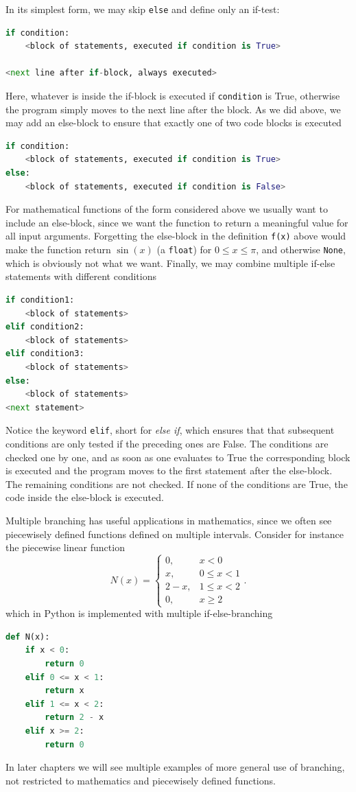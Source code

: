 \documentclass[graybox,envcountchap,sectrefs,final]{svmonodo}
\begin{document}
In its simplest form, we may skip \texttt{else} and define only an if-test:
\begin{lstlisting}[language=Python,style=blue1]
if condition:
    <block of statements, executed if condition is True>

<next line after if-block, always executed>
\end{lstlisting}
Here, whatever is inside the if-block is executed if \texttt{condition} is True, otherwise the program simply moves to the next line
after the block. As we did above, we may add an else-block to ensure that exactly one of two code blocks is executed
\begin{lstlisting}[language=Python,style=blue1]
if condition:
    <block of statements, executed if condition is True>
else:
    <block of statements, executed if condition is False>
\end{lstlisting}
For mathematical functions of the form considered above we usually want to include an else-block, since we want the function
to return a meaningful value for all input arguments. Forgetting the else-block in the definition \texttt{f(x)} above would
make the function return $\sin(x)$ (a \texttt{float}) for $0\leq x \leq \pi$, and otherwise \texttt{None}, which is obviously not what we want.
Finally, we may combine multiple if-else statements with different conditions
\begin{lstlisting}[language=Python,style=blue1]
if condition1:
    <block of statements>
elif condition2:
    <block of statements>
elif condition3:
    <block of statements>
else:
    <block of statements>
<next statement>
\end{lstlisting}
Notice the keyword \texttt{elif}, short for \emph{else if}, which ensures that that subsequent conditions are only tested if the preceding
ones are False. The conditions are checked one by one, and as soon as one evaluates to True the corresponding
block is executed and the program moves to the first statement after the else-block.  The remaining conditions are not checked.
If none of the conditions are True, the code inside the else-block is executed.

Multiple branching has useful applications in mathematics, since we often see piecewisely defined functions defined on
multiple intervals. Consider for instance the piecewise linear function
\[
N(x) = \left\lbrace\begin{array}{ll}
0, & x < 0\\ 
x, & 0\leq x < 1\\ 
2-x, & 1\leq x < 2\\ 
0, & x \geq 2
\end{array}\right. .
\]
which in Python is implemented with multiple if-else-branching
\begin{lstlisting}[language=Python,style=blue1]
def N(x):
    if x < 0:
        return 0
    elif 0 <= x < 1:
        return x
    elif 1 <= x < 2:
        return 2 - x
    elif x >= 2:
        return 0
\end{lstlisting}
In later chapters we will see multiple examples of more general use of branching, not restricted to mathematics and
piecewisely defined functions.
\end{document}

